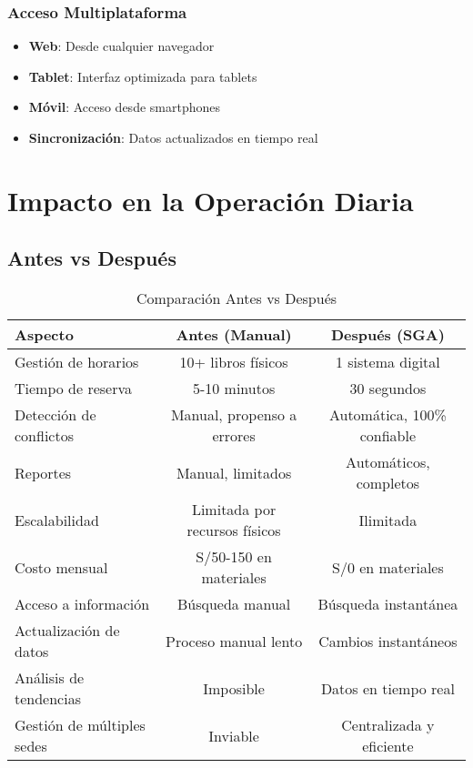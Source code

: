 \documentclass[12pt,a4paper]{article}
\begin{document}
\subsubsection{Acceso Multiplataforma}
\begin{itemize}
    \item \textbf{Web}: Desde cualquier navegador
    \item \textbf{Tablet}: Interfaz optimizada para tablets
    \item \textbf{Móvil}: Acceso desde smartphones
    \item \textbf{Sincronización}: Datos actualizados en tiempo real
\end{itemize}

\section{Impacto en la Operación Diaria}

\subsection{Antes vs Después}

\begin{table}[H]
\centering
\begin{tabular}{|l|c|c|}
\hline
\textbf{Aspecto} & \textbf{Antes (Manual)} & \textbf{Después (SGA)} \\
\hline
Gestión de horarios & 10+ libros físicos & 1 sistema digital \\
Tiempo de reserva & 5-10 minutos & 30 segundos \\
Detección de conflictos & Manual, propenso a errores & Automática, 100\% confiable \\
Reportes & Manual, limitados & Automáticos, completos \\
Escalabilidad & Limitada por recursos físicos & Ilimitada \\
Costo mensual & S/50-150 en materiales & S/0 en materiales \\
Acceso a información & Búsqueda manual & Búsqueda instantánea \\
Actualización de datos & Proceso manual lento & Cambios instantáneos \\
Análisis de tendencias & Imposible & Datos en tiempo real \\
Gestión de múltiples sedes & Inviable & Centralizada y eficiente \\
\hline
\end{tabular}
\caption{Comparación Antes vs Después}
\end{table}
\end{document}
